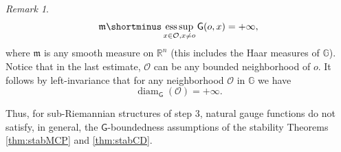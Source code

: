 \documentclass[11pt,a4paper]{article}
\theoremstyle{plain}
\theoremstyle{definition}
\theoremstyle{remark}
\newtheorem{remark}[theorem]{Remark}
\numberwithin{equation}{section}
\newcommand{\R}{\mathbb{R}} %
\DeclareMathOperator{\diam}{\mathrm{diam}}
\DeclareMathOperator*{\esssup}{ess\,sup}
\newcommand{\mm}{\mathfrak m}
\newcommand{\sfG}{\mathsf G}
\begin{document}
\begin{remark}
\begin{equation}
\mm\shortminus\esssup_{x\in \mathcal{O}, x\neq o}\sfG(o,x) = +\infty,
\end{equation}
where $\mm$ is any smooth measure on $\R^n$ (this includes the Haar measures of $\mathbb{G}$). Notice that in the last estimate, $\mathcal{O}$ can be any bounded neighborhood of $o$. It follows by left-invariance that for any neighborhood $\mathcal{O}$ in $\mathbb{G}$ we have
\begin{equation}\label{eq:unboundedness}
\diam_{\sfG}(\mathcal{O}) = +\infty.
\end{equation}

Thus, for sub-Riemannian structures of step $3$, natural gauge functions do not satisfy, in general, the $\sfG$-boundedness assumptions of the stability Theorems \ref{thm:stabMCP} and \ref{thm:stabCD}.
\end{remark}
\end{document}
